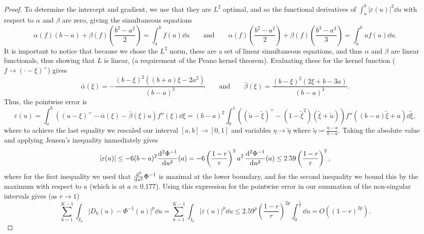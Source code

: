 \documentclass[manuscript,review]{acmart}
\begin{document}
\begin{proof}
To determine the intercept and gradient, we use that they are $ L^2 $ optimal, and so the functional derivatives of $ \int_a^b \lvert \varepsilon(u) \rvert^2 \dd{u} $ with respect to $ \alpha $ and $ \beta $ are zero, giving the simultaneous equations
\begin{equation*}
\alpha(f)(b-a) + \beta(f) \left(\dfrac{b^2 - a^2}{2}\right)  = \int_{a}^{b} f(u) \dd{u} 
\qquad \text{and} \qquad 
\alpha(f)\left(\dfrac{b^2 - a^2}{2}\right) + \beta(f) \left(\dfrac{b^3 - a^3}{3}\right)  = \int_{a}^{b} u f(u) \dd{u}.
\end{equation*}
It is important to notice that because we chose the $ L^2 $ norm, these are a set of linear simultaneous equations, and thus $ \alpha $ and $ \beta $ are linear functionals, thus showing that $ L $ is linear, (a requirement of the Peano kernel theorem). Evaluating these for the kernel function ($ f \to (\cdot - \xi)^+  $) gives
\begin{equation*}
\bar{\alpha}(\xi)  = - \dfrac{(b - \xi)^2 ((b+a)\xi - 2a^2)}{(b - a)^3} 
\qquad \text{and} \qquad 
\label{eqt:peano_kernel_coefficient}
\bar{\beta}(\xi) = \dfrac{(b - \xi)^2 (2\xi + b - 3a)}{(b - a)^3}.
\end{equation*}
Thus, the pointwise error is 
\begin{equation*}
\varepsilon(u)  = \int_{a}^{b} ((u - \xi)^+ - \bar{\alpha}(\xi) - \bar{\beta}(\xi) u ) f''(\xi) \dd{\xi} = (b - a)^2 \int_{0}^{1} \left((\widetilde{u} - \widetilde{\xi})^+ - (1 - \widetilde{\xi}^2)(\widetilde{\xi} + \widetilde{u})\right) f''((b - a)\widetilde{\xi} + a) \dd{\widetilde{\xi}},
\end{equation*}
where to achieve the last equality we rescaled our interval $ [a, b] \to [0, 1] $  and variables $ \eta \to \tilde{\eta}  $ where $ \tilde{\eta} \coloneqq \tfrac{\eta - a}{b - a} $. Taking the absolute value and applying Jensen's inequality immediately gives 
\begin{equation*}
\lvert \varepsilon(u) \rvert \leq - 6 (b - a)^2  {\dv[2]{\Phi^{-1}}{u}}(a) = - 6 \left(\dfrac{1-r}{r}\right)^2 a^2\, {\dv[2]{\Phi^{-1}}{u}}(a) \leq 2.59 \left(\dfrac{1-r}{r}\right)^2,
\end{equation*}
where for the first inequality we used that $ {\dv[2]{}{u}}\Phi^{-1} $ is maximal at the lower boundary, and for the second inequality we bound this by the maximum with respect to $ a $ (which is at $a \approx 0.177$). Using this expression for the pointwise error in our summation of the non-singular intervals gives (as $ r \to 1 $)
\begin{equation*}
 \sum_{k=1}^{K-1} \int_{I_k} \lvert D_k(u) - \Phi^{-1}(u)\rvert^p \dd{u}
= \sum_{k = 1}^{K - 1} \int_{I_k} \lvert\varepsilon(u)\rvert^p \dd{u}
\leq 2.59^p \left(\dfrac{1 - r}{r}\right)^{2p}  \int_{0}^{\frac{1}{2}} \dd{u}
= O((1-r)^{2p}).
\end{equation*}


\end{proof}
\end{document}
